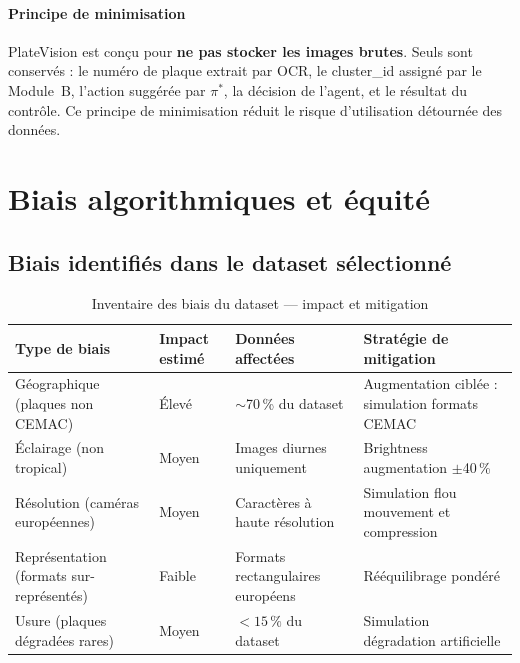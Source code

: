 \paragraph{Principe de minimisation}
PlateVision est con\c{c}u pour \textbf{ne pas stocker les images brutes}.
Seuls sont conserv\'{e}s : le num\'{e}ro de plaque extrait par OCR, le
cluster\_id assign\'{e} par le Module~B, l'action sugg\'{e}r\'{e}e par
$\pi^*$, la d\'{e}cision de l'agent, et le r\'{e}sultat du contr\^{o}le.
Ce principe de minimisation r\'{e}duit le risque d'utilisation d\'{e}tourn\'{e}e
des donn\'{e}es.

\section{Biais algorithmiques et \'{e}quit\'{e}}
\label{sec:d:biais}

\subsection{Biais identifi\'{e}s dans le dataset s\'{e}lectionn\'{e}}
\label{sec:d:biais_dataset}

\begin{table}[H]
\centering
\caption{Inventaire des biais du dataset --- impact et mitigation}
\label{tab:d:biais}
\begin{tabular}{p{3cm}p{3cm}p{3cm}p{4cm}}
\toprule
\textbf{Type de biais} & \textbf{Impact estim\'{e}} & \textbf{Donn\'{e}es affect\'{e}es} & \textbf{Strat\'{e}gie de mitigation} \\
\midrule
G\'{e}ographique (plaques non CEMAC)
  & \'{E}lev\'{e}
  & $\sim$70\,\% du dataset
  & Augmentation cibl\'{e}e : simulation formats CEMAC \\
\'{E}clairage (non tropical)
  & Moyen
  & Images diurnes uniquement
  & Brightness augmentation $\pm$40\,\% \\
R\'{e}solution (cam\'{e}ras europ\'{e}ennes)
  & Moyen
  & Caract\`{e}res \`{a} haute r\'{e}solution
  & Simulation flou mouvement et compression \\
Repr\'{e}sentation (formats sur-repr\'{e}sent\'{e}s)
  & Faible
  & Formats rectangulaires europ\'{e}ens
  & R\'{e}\'{e}quilibrage pond\'{e}r\'{e} \\
Usure (plaques d\'{e}grad\'{e}es rares)
  & Moyen
  & $< 15\,\%$ du dataset
  & Simulation d\'{e}gradation artificielle \\
\bottomrule
\end{tabular}
\end{table}

